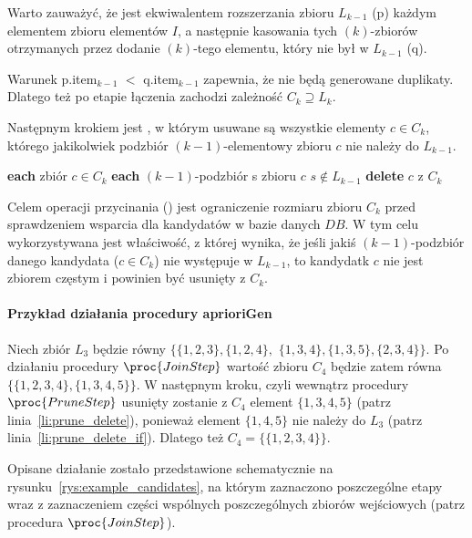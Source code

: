 Warto zauważyć, że  jest ekwiwalentem rozszerzania zbioru $L_{k-1}$ (p) każdym elementem zbioru elementów $I$, a następnie kasowania tych $(k)$-zbiorów otrzymanych przez dodanie $(k)$-tego elementu, który nie był w $L_{k-1}$ (q). 

Warunek p.item$_{k-1}$ $<$ q.item$_{k-1}$ zapewnia, że nie będą generowane duplikaty. Dlatego też po etapie łączenia zachodzi zależność $C_k \supseteq L_k$.

Następnym krokiem jest , w którym usuwane są wszystkie elementy $c \in C_k$, którego jakikolwiek podzbiór $(k-1)$-elementowy zbioru $c$ nie należy do $L_{k-1}$.

\begin{codebox}
		\li \For \textbf{each} zbiór $c \in C_k$ 
		\li \Do
			\li \For \textbf{each} $(k-1)$-podzbiór s zbioru $c$
					\li \Do 
						\If $s \notin L_{k-1}$ \label{li:prune_delete_if}
						\li \Then
							\textbf{delete} $c$ z $C_k$\label{li:prune_delete}
						\End
					\End
		\End
\end{codebox}

Celem operacji przycinania () jest ograniczenie rozmiaru zbioru $C_k$ przed sprawdzeniem wsparcia dla kandydatów w bazie danych $DB$. W tym celu wykorzystywana jest właściwość, z której wynika, że jeśli jakiś $(k-1)$-podzbiór danego kandydata ($c \in C_k$) nie występuje w $L_{k-1}$, to kandydatk $c$ nie jest zbiorem częstym i powinien być usunięty z $C_k$.

\paragraph{Przykład działania procedury aprioriGen}
Niech zbiór $L_3$ będzie równy $\lbrace \lbrace 1, 2, 3 \rbrace, \lbrace 1,2,4 \rbrace,$ $\lbrace 1,3,4 \rbrace, \lbrace 1, 3, 5 \rbrace, \lbrace 2, 3, 4 \rbrace \rbrace$. Po działaniu procedury $\proc{Join Step}$ wartość zbioru $C_4$ będzie zatem równa $\lbrace \lbrace 1, 2, 3, 4 \rbrace, \lbrace 1, 3, 4, 5 \rbrace \rbrace$. W następnym kroku, czyli wewnątrz procedury $\proc{Prune Step}$ usunięty zostanie z $C_4$ element $\lbrace 1, 3, 4, 5 \rbrace$ (patrz linia~\ref{li:prune_delete}), ponieważ element $\lbrace 1, 4, 5 \rbrace$ nie należy do $L_3$ (patrz linia~\ref{li:prune_delete_if}). Dlatego też $C_4 = \lbrace \lbrace 1, 2, 3, 4 \rbrace \rbrace$. 

Opisane działanie zostało przedstawione schematycznie na rysunku~\ref{rys:example_candidates}, na którym zaznaczono poszczególne etapy wraz z zaznaczeniem części wspólnych poszczególnych zbiorów wejściowych (patrz procedura $\proc{Join Step}$).

